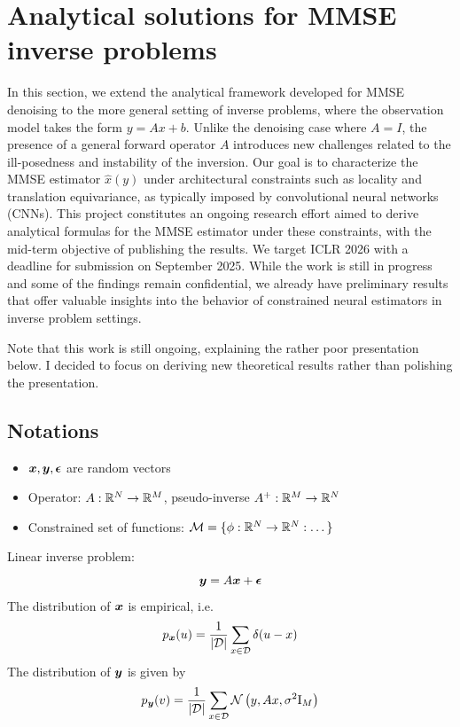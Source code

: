 \documentclass[a4paper,10pt]{article}
\begin{document}
\section{Analytical solutions for MMSE inverse problems}
In this section, we extend the analytical framework developed for MMSE denoising to the more general setting of inverse problems, where the observation model takes the form $y=Ax+b$. Unlike the denoising case where $A=I$, the presence of a general forward operator $A$ introduces new challenges related to the ill-posedness and instability of the inversion. Our goal is to characterize the MMSE estimator $\hat{x}(y)$ under architectural constraints such as locality and translation equivariance, as typically imposed by convolutional neural networks (CNNs). This project constitutes an ongoing research effort aimed to derive analytical formulas for the MMSE estimator under these constraints, with the mid-term objective of publishing the results. We target ICLR 2026 with a deadline for submission on September 2025. While the work is still in progress and some of the findings remain confidential, we already have preliminary results that offer valuable insights into the behavior of constrained neural estimators in inverse problem settings.

Note that this work is still ongoing, explaining the rather poor presentation below. I decided to focus on deriving new theoretical results rather than polishing the presentation. 

\subsection{Notations}
\begin{itemize}
    \item[]  $\boldsymbol{x}, \boldsymbol{y}, \boldsymbol{\epsilon}$ are random vectors 
    \item[] Operator: $A: \mathbb{R}^N \to \mathbb{R}^M$, pseudo-inverse $A^+ : \mathbb{R}^M \to \mathbb{R}^N$
    \item[] Constrained set of functions: $\mathcal{M} = \{ \phi : \mathbb{R}^N \to \mathbb{R}^N: \dots \}$
\end{itemize}
Linear inverse problem:
\begin{equation*}
   \boldsymbol{y} = A \boldsymbol{x} + \boldsymbol{\epsilon} 
\end{equation*}
The distribution of $\boldsymbol{x}$ is empirical, i.e.
\begin{equation}
    p_{\boldsymbol{x}}(u) =  \frac{1}{|\mathcal{D}|}\sum_{x\in\mathcal{D}} \delta(u-x)
\end{equation}
The distribution of $\boldsymbol{y}$ is given by
\begin{equation*}
    p_{\boldsymbol{y}}(v) = \frac{1}{|\mathcal{D}|}\sum_{x\in\mathcal{D}} \mathcal{N}\left( {y,Ax,\sigma^2\mathrm{I}_M} \right)
\end{equation*}
\end{document}
